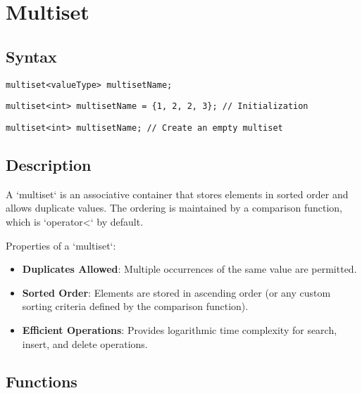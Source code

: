 \documentclass{article}
\begin{document}
\newpage\section{Multiset}

\subsection{Syntax}

\begin{lstlisting}
multiset<valueType> multisetName;
\end{lstlisting}

\begin{lstlisting}
multiset<int> multisetName = {1, 2, 2, 3}; // Initialization
\end{lstlisting}

\begin{lstlisting}
multiset<int> multisetName; // Create an empty multiset
\end{lstlisting}

\subsection{Description}

A `multiset` is an associative container that stores elements in sorted order and allows duplicate values. The ordering is maintained by a comparison function, which is `operator<` by default.

\noindent Properties of a `multiset`:
\begin{itemize}
    \item \textbf{Duplicates Allowed}: Multiple occurrences of the same value are permitted.
    \item \textbf{Sorted Order}: Elements are stored in ascending order (or any custom sorting criteria defined by the comparison function).
    \item \textbf{Efficient Operations}: Provides logarithmic time complexity for search, insert, and delete operations.
\end{itemize}

\subsection{Functions}
\end{document}

